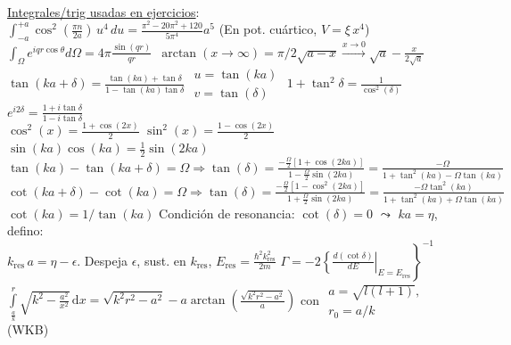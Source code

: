         \\
\vspace{5pt}
\underline{Integrales/trig usadas en ejercicios}:\\
$\int_{-a}^{+a}\cos^2 (\tfrac{\pi n}{2a}) \, u^4 \, du = \tfrac{\pi^2 -20\pi^2+120}{5\pi ^4} a^5 
$ (En pot. cuártico, $V= \xi \,  x^4$)\\
$\int_{\Omega} e^{iqr \cos \theta} d\Omega = 4\pi\frac{\sin (qr)}{qr}$\;\;\;\, $\arctan(x\rightarrow \infty)=\pi /2$\;\;\;\;$\sqrt{a-x} \xrightarrow{x\rightarrow0}\sqrt{a}-\frac{x}{2\sqrt{a}}$
\\
$\tan (ka+\delta) = \frac{\tan (ka)+ \tan \delta}{1- \tan (ka)\tan\delta}$ \!\!\!\! $\begin{array}{ll}
     u = \tan(ka)  \\
     v = \tan(\delta) 
\end{array}$\;\;\; $1+\tan^2 \delta = \frac{1}{\cos^2(\delta)}$ \;\;\;\; $e^{i2\delta} = \frac{1 + i \tan \delta}{1- i\tan \delta}$
\\
$\cos^2 (x)= \frac{1+\cos(2x)}{2}$\;\;\; $\sin^2(x)=\frac{1-\cos (2x)}{2}$\;\;\;\; $\sin(ka)\cos(ka)=\frac{1}{2}\sin(2ka)$\\
$\tan(ka)-\tan(ka+\delta) = \Omega \Rightarrow \tan(\delta) = \frac{-\frac{\Omega}{2} [1+\cos(2ka)]}{1-\frac{\Omega}{2}\sin(2ka)}=\frac{-\Omega}{1+\tan^2(ka)-\Omega\tan(ka)}$
\\
$\cot(ka+\delta)-\cot(ka)=\Omega \Rightarrow \tan(\delta) = \frac{-\frac{\Omega}{2} [1-\cos^2(2ka)]}{1+\frac{\Omega}{2}\sin(2ka)} = \frac{-\Omega\tan^2(ka)}{1+\tan^2(ka)+\Omega\tan(ka)}$ \\$\cot (ka)=1/\tan(ka)$ Condición de resonancia: $\cot(\delta)=0$ $\leadsto$ $ka =\eta$, defino:\\
$k_{\text{res}} \,a = \eta - \epsilon$. Despeja $\epsilon$, sust. en $k_{\text{res}}$, $E_{\text{res}} = \frac{\hbar^2 k_{\text{res}}^2}{2m}$ \;\;$\Gamma= -2 \left.\left\{\frac{d(\cot\delta)}{dE}\right|_{E=E_{\text{res}}}\right\}^{-1}$
\\
$\int\limits^{r}_{\frac{a}{k}} \sqrt{k^{2} - \frac{a^{2}}{x^{2}}} \, \mathrm{d}x=
\sqrt{k^{2} r^{2} - a^{2}} - a \arctan\left(\frac{\sqrt{k^{2} r^{2} - a^{2}}}{a}\right)$ con $\begin{array}{cc}
     a = \sqrt{l(l+1)}, \\
     r_0= a/k
\end{array}$ \;  (WKB)\\




